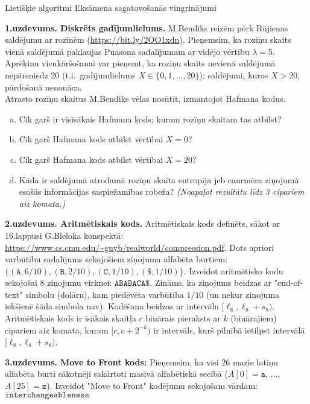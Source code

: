 \documentclass[11pt]{article}
\begin{document}
\thispagestyle{empty}

% 


{\Large Lietišķie algoritmi \textendash{} Eksāmena sagatavošanās vingrinājumi}

\noindent
{\bf 1.uzdevums. Diskrēts gadījumlielums.}
M.Bendiks reizēm pērk Rūjienas saldējumu ar rozīnēm (\url{https://bit.ly/2OO1xdn}).
Pieņemsim, ka rozīņu skaits vienā saldējumā pakļaujas Puasona sadalījumam 
ar vidējo vērtību $\lambda = 5$. Aprēķinu vienkāršošanai var pieņemt, ka
rozīņu skaits nevienā saldējumā nepārsniedz $20$ (t.i.\ gadījumlielums
$X \in \{ 0,1,\ldots,20 \}$); saldējumi, kuros $X > 20$, 
pārdošanā nenonāca.\\
Atrasto rozīņu skaitus M.Bendiks vēlas nosūtīt, izmantojot Hafmana kodus. 
\begin{enumerate}[(a)]
\item Cik garš ir visīsākais Hafmana kods; kuram rozīņu skaitam tas atbilst?
\item Cik garš Hafmana kods atbilst vērtībai $X=0$?
\item Cik garš Hafmana kods atbilst vērtībai $X=20$?
\item Kāda ir saldējumā atrodamā rozīņu skaita entropija jeb caurmēra ziņojumā
esošās informācijas saspiežamības robeža? {\em (Noapaļot rezultātu līdz 3 cipariem 
aiz komata.)}
\end{enumerate}

\vspace{6pt}
{\bf 2.uzdevums. Aritmētiskais kods.}
Aritmētiskais kods definēts, sākot ar 16.lappusi G.Bleloka konspektā: 
\url{https://www.cs.cmu.edu/~guyb/realworld/compression.pdf}. 
Dots apriori varbūtību sadalījums sekojošiem ziņojuma alfabēta 
burtiem: $\{ (\mathtt{A},6/10), (\mathtt{B},2/10), (\mathtt{C},1/10), 
(\mathtt{\$},1/10) \}$. Izveidot aritmētisko kodu sekojošai $8$ ziņojumu virknei:
$\mathtt{ABABACA\$}$.
Zināms, ka ziņojums beidzas ar "end-of-text" simbolu (dolāru), kam piedēvēta varbūtība $1/10$
(un nekur ziņojuma iekšienē šāda simbola nav).  
Kodēšana beidzas ar intervālu $[\ell_8,\ell_8+s_8)$. 
Aritmētiskais kods ir īsākais skaitļa $c$ binārais pieraksts ar $k$ (binārajiem) cipariem 
aiz komata, kuram $[c,c+2^{-k})$ ir intervāls, kurš pilnībā ietilpst
intervālā $[\ell_8,\ell_8+s_8)$.


\vspace{6pt}
{\bf 3.uzdevums. Move to Front kods:} Pieņemsim, ka visi $26$ mazie 
latīņu alfabēta burti sākotnēji sakārtoti masīvā alfabētiskā secībā
($A[0]=\mathtt{a}$, $\ldots$, $A[25]=\mathtt{z}$). 
Izveidot "Move to Front" kodējumu sekojošam vārdam: $\mathtt{interchangeableness}$
\end{document}
